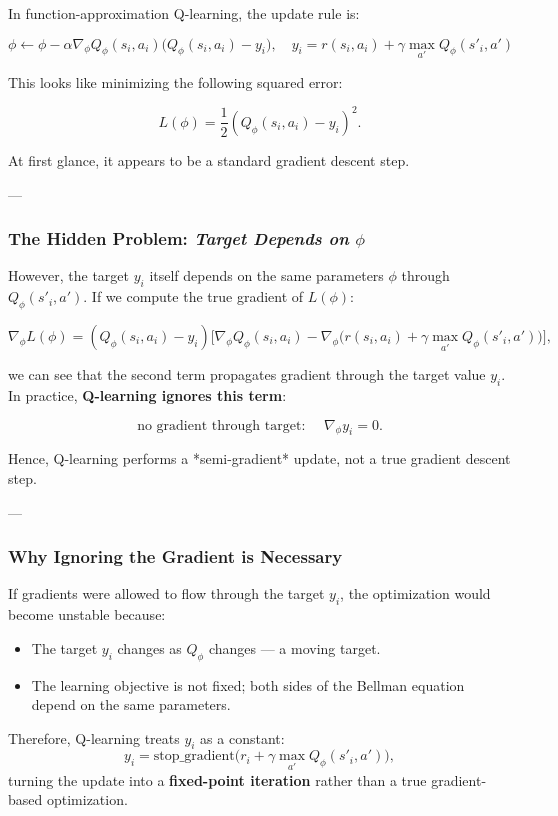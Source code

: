 \documentclass[12pt]{article}
\theoremstyle{definition} %
\theoremstyle{plain} %
\theoremstyle{remark} %
\begin{document}
\begin{CJK}{UTF8}{gbsn}
In function-approximation Q-learning, the update rule is:

\[
\phi \leftarrow \phi - \alpha \nabla_\phi Q_\phi(s_i, a_i)
\big( Q_\phi(s_i,a_i) - y_i \big),
\quad 
y_i = r(s_i,a_i) + \gamma \max_{a'} Q_\phi(s'_i, a')
\]

This looks like minimizing the following squared error:

\[
L(\phi) = \frac{1}{2} (Q_\phi(s_i,a_i) - y_i)^2.
\]

At first glance, it appears to be a standard gradient descent step.

---

\subsubsection{The Hidden Problem: \textit{Target Depends on } $\phi$}

However, the target \( y_i \) itself depends on the same parameters \( \phi \) through \( Q_\phi(s'_i,a') \).
If we compute the true gradient of \( L(\phi) \):

\[
\nabla_\phi L(\phi)
= (Q_\phi(s_i,a_i) - y_i)
\Big[
\nabla_\phi Q_\phi(s_i,a_i)
- \nabla_\phi \big(r(s_i,a_i) + \gamma \max_{a'} Q_\phi(s'_i,a')\big)
\Big],
\]

we can see that the second term propagates gradient through the target value \(y_i\).
In practice, \textbf{Q-learning ignores this term}:

\[
\text{no gradient through target: } \quad
\nabla_\phi y_i = 0.
\]

Hence, Q-learning performs a *semi-gradient* update, not a true gradient descent step.

---

\subsubsection{Why Ignoring the Gradient is Necessary}

If gradients were allowed to flow through the target \(y_i\), the optimization would become unstable because:
\begin{itemize}
    \item The target \(y_i\) changes as \(Q_\phi\) changes --- a moving target.
    \item The learning objective is not fixed; both sides of the Bellman equation depend on the same parameters.
\end{itemize}

Therefore, Q-learning treats \(y_i\) as a constant:
\[
y_i = \text{stop\_gradient}\big(r_i + \gamma \max_{a'} Q_\phi(s'_i,a')\big),
\]
turning the update into a \textbf{fixed-point iteration} rather than a true gradient-based optimization.


\end{CJK}
\end{document}
